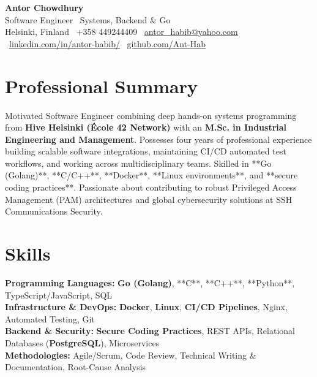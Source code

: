 \documentclass[a4paper,11pt]{article}
\begin{document}
\vspace*{2pt}

\begin{center}
    {\Huge {}\selectfont \textbf{Antor Chowdhury}} \\[4pt]
    {\large {}\selectfont Software Engineer \textbar\ Systems, Backend \& Go} \\[4pt]
    \small
    Helsinki, Finland \textbar\ +358 449244409 \textbar\ 
    \href{mailto:antor_habib@yahoo.com}{\underline{antor\_habib@yahoo.com}} \textbar\ 
    \href{https://www.linkedin.com/in/antor-habib/}{\underline{linkedin.com/in/antor-habib/}} \textbar\ 
    \href{https://github.com/Ant-Hab}{\underline{github.com/Ant-Hab}}
\end{center}

\vspace{-2pt}

\section{Professional Summary}
\begin{justify}
\small{
Motivated Software Engineer combining deep hands-on systems programming from \textbf{Hive Helsinki (École 42 Network)} with an \textbf{M.Sc. in Industrial Engineering and Management}. Possesses four years of professional experience building scalable software integrations, maintaining CI/CD automated test workflows, and working across multidisciplinary teams. Skilled in **Go (Golang)**, **C/C++**, **Docker**, **Linux environments**, and **secure coding practices**. Passionate about contributing to robust Privileged Access Management (PAM) architectures and global cybersecurity solutions at SSH Communications Security.
}
\end{justify}

\vspace{-6pt}

\section{Skills}
\begin{itemize}[leftmargin=0.15in, label={}, itemsep=0pt, topsep=1pt]
\small{\item{
\textbf{Programming Languages:} \textbf{Go (Golang)}, **C**, **C++**, **Python**, TypeScript/JavaScript, SQL \\
\textbf{Infrastructure \& DevOps:} \textbf{Docker}, \textbf{Linux}, \textbf{CI/CD Pipelines}, Nginx, Automated Testing, Git \\
\textbf{Backend \& Security:} \textbf{Secure Coding Practices}, REST APIs, Relational Databases (\textbf{PostgreSQL}), Microservices \\
\textbf{Methodologies:} Agile/Scrum, Code Review, Technical Writing \& Documentation, Root-Cause Analysis
}}
\end{itemize}
\end{document}
